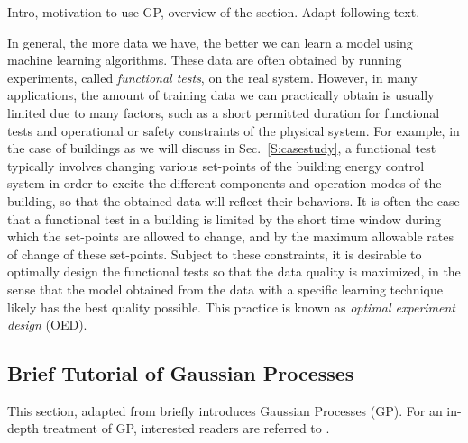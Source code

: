 \begin{todo}
  Intro, motivation to use GP, overview of the section.
  Adapt following text.
\end{todo}

In general, the more data we have, the better we can learn a model using machine learning algorithms.
These data are often obtained by running experiments, called \emph{functional tests}, on the real system.
However, in many applications, the amount of training data we can practically obtain is usually limited due to many factors, such as a short permitted duration for functional tests and operational or safety constraints of the physical system.
For example, in the case of buildings as we will discuss in Sec.~\ref{S:casestudy}, a functional test typically involves changing various set-points of the building energy control system in order to excite the different components and operation modes of the building, so that the obtained data will reflect their behaviors.
It is often the case that a functional test in a building is limited by the short time window during which the set-points are allowed to change, and by the maximum allowable rates of change of these set-points.
Subject to these constraints, it is desirable to optimally design the functional tests so that the data quality is maximized, in the sense that the model obtained from the data with a specific learning technique likely has the best quality possible.
This practice is known as \emph{optimal experiment design} (OED).


\subsection{Brief Tutorial of Gaussian Processes}
\label{sec:modeling:gp}

This section, adapted from \cite{JainICCPS2018} briefly introduces Gaussian Processes (GP).
For an in-depth treatment of GP, interested readers are referred to \cite{Rasmussen2006}.

